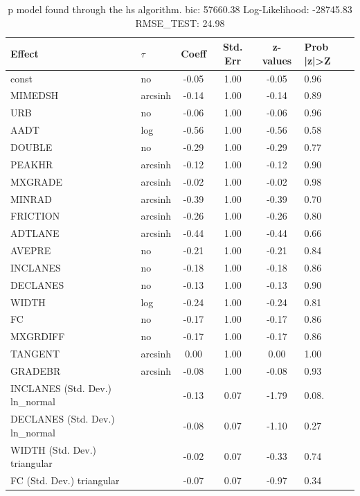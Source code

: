 \begin{table}
	\caption{p model found through the hs algorithm. bic: 57660.38 Log-Likelihood: -28745.83 RMSE_TEST: 24.98}
	\begin{center}
		\begin{tabular}{|l|l|c|c|c|l|}
			\hline
			Effect & $\tau$ & Coeff & Std. Err & z-values & Prob |z|>Z \\
			\hline
			const & no & -0.05 & 1.00 & -0.05 & 0.96 \\
			\hline
			MIMEDSH & arcsinh & -0.14 & 1.00 & -0.14 & 0.89 \\
			\hline
			URB & no & -0.06 & 1.00 & -0.06 & 0.96 \\
			\hline
			AADT & log & -0.56 & 1.00 & -0.56 & 0.58 \\
			\hline
			DOUBLE & no & -0.29 & 1.00 & -0.29 & 0.77 \\
			\hline
			PEAKHR & arcsinh & -0.12 & 1.00 & -0.12 & 0.90 \\
			\hline
			MXGRADE & arcsinh & -0.02 & 1.00 & -0.02 & 0.98 \\
			\hline
			MINRAD & arcsinh & -0.39 & 1.00 & -0.39 & 0.70 \\
			\hline
			FRICTION & arcsinh & -0.26 & 1.00 & -0.26 & 0.80 \\
			\hline
			ADTLANE & arcsinh & -0.44 & 1.00 & -0.44 & 0.66 \\
			\hline
			AVEPRE & no & -0.21 & 1.00 & -0.21 & 0.84 \\
			\hline
			INCLANES & no & -0.18 & 1.00 & -0.18 & 0.86 \\
			\hline
			DECLANES & no & -0.13 & 1.00 & -0.13 & 0.90 \\
			\hline
			WIDTH & log & -0.24 & 1.00 & -0.24 & 0.81 \\
			\hline
			FC & no & -0.17 & 1.00 & -0.17 & 0.86 \\
			\hline
			MXGRDIFF & no & -0.17 & 1.00 & -0.17 & 0.86 \\
			\hline
			TANGENT & arcsinh & 0.00 & 1.00 & 0.00 & 1.00 \\
			\hline
			GRADEBR & arcsinh & -0.08 & 1.00 & -0.08 & 0.93 \\
			\hline
			INCLANES (Std. Dev.) ln_normal &  & -0.13 & 0.07 & -1.79 & 0.08. \\
			\hline
			DECLANES (Std. Dev.) ln_normal &  & -0.08 & 0.07 & -1.10 & 0.27 \\
			\hline
			WIDTH (Std. Dev.) triangular &  & -0.02 & 0.07 & -0.33 & 0.74 \\
			\hline
			FC (Std. Dev.) triangular &  & -0.07 & 0.07 & -0.97 & 0.34 \\

\end{tabular}
\end{center}
\end{table}

